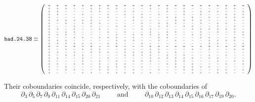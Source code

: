 \documentclass[11pt,a4paper]{article}
\begin{document}
  \[\texttt{had.24.38}\equiv {\fontsize{4}{5}\selectfont \left( \begin{array}{cccccccccccccccccccccccc}
  +&+&+&+&+&+&+&+&+&+&+&+&+&+&+&+&+&+&+&+&+&+&+&+\\
 +&+&+&-&-&+&+&+&+&-&-&-&+&-&+&-&+&-&-&-&-&+&+&-\\
 +&+&-&-&-&+&+&-&-&+&+&-&-&-&+&-&+&-&+&+&+&-&-&+\\
 +&+&-&-&+&-&-&+&-&+&-&+&-&+&-&-&+&-&+&-&-&+&+&+\\
 +&-&-&-&-&+&-&+&-&-&+&+&-&-&+&+&-&+&-&+&-&+&+&+\\
 +&+&+&+&+&+&-&-&-&-&+&-&-&-&-&+&+&+&+&-&-&-&+&-\\
 +&-&+&-&+&+&+&-&-&-&-&+&-&+&+&+&-&-&+&-&+&+&-&-\\
 +&-&-&+&-&+&-&-&+&+&-&+&-&+&+&-&+&+&-&-&+&-&+&-\\
 +&+&-&+&-&-&+&-&-&-&-&+&+&-&-&-&-&+&+&+&+&+&+&-\\
 +&-&+&+&-&-&-&+&-&+&-&-&+&-&+&+&-&-&+&-&+&-&+&+\\
 +&+&+&-&-&-&-&-&+&-&+&+&+&+&+&-&-&+&+&-&-&-&-&+\\
 +&-&-&+&+&-&+&+&+&-&+&-&-&+&+&-&-&-&+&+&-&-&+&-\\
 +&+&+&-&-&-&-&-&+&+&+&-&-&+&-&+&-&-&-&+&+&+&+&-\\
 +&+&+&+&+&+&-&+&+&-&-&+&-&-&-&-&-&-&-&+&+&-&-&+\\
 +&-&-&+&-&+&-&-&+&-&-&-&+&+&-&+&+&-&+&+&-&+&-&+\\
 +&-&+&-&+&+&+&-&-&+&-&-&+&+&-&-&-&+&-&+&-&-&+&+\\
 +&+&-&+&-&+&+&+&-&+&+&+&+&+&-&+&-&-&-&-&-&-&-&-\\
 +&-&+&+&+&-&-&-&-&+&+&+&+&-&+&-&+&-&-&+&-&+&-&-\\
 +&+&-&-&+&-&-&+&-&-&-&-&+&+&+&+&+&+&-&+&+&-&-&-\\
 +&-&-&-&+&-&+&-&+&-&+&+&+&-&-&+&+&-&-&-&+&-&+&+\\
 +&+&-&+&+&-&+&-&+&+&-&-&-&-&+&+&-&+&-&-&-&+&-&+\\
 +&-&+&-&-&-&+&+&+&+&-&+&-&-&-&+&+&+&+&+&-&-&-&-\\
 +&-&+&+&-&-&+&+&-&-&+&-&-&+&-&-&+&+&-&-&+&+&-&+\\
 +&-&-&-&+&+&-&+&+&+&+&-&+&-&-&-&-&+&+&-&+&+&-&-
  \end{array}
  \right)}\]

Their coboundaries coincide, respectively, with the coboundaries of
\[\partial_3\,\partial_5\,\partial_7\,\partial_9\,\partial_{11}\,\partial_{14}\,\partial_{15}\,\partial_{20}\,\partial_{21} \hspace{1cm} \text{and} \hspace{1cm} \partial_{10}\,\partial_{12}\,\partial_{13}\,\partial_{14}\,\partial_{15}\,\partial_{16}\,\partial_{17}\,\partial_{19}\,\partial_{20}.\]
\end{document}
